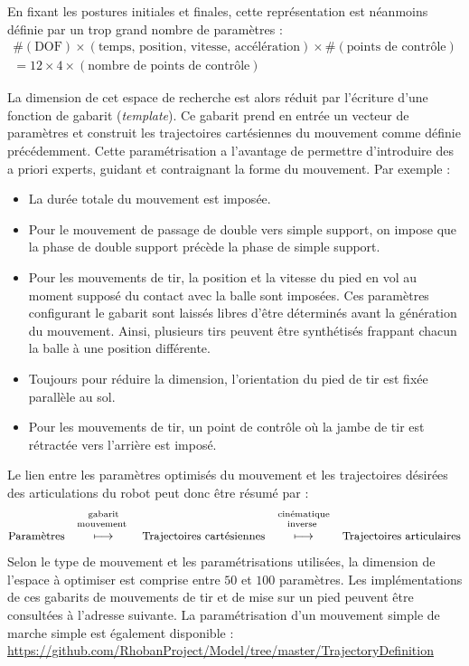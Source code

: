 En fixant les postures initiales et finales, cette représentation
est néanmoins définie par un trop grand nombre de paramètres : 
\begin{gather*}
\#(\text{DOF}) \times (\text{temps, position, vitesse, accélération}) 
\times \#(\text{points de contrôle}) \\
= 12 \times 4 \times(\text{nombre de points de contrôle})
\end{gather*}

La dimension de cet espace de recherche est alors réduit par
l'écriture d'une fonction de gabarit (\textit{template}).
Ce gabarit prend en entrée un vecteur de paramètres et construit 
les trajectoires cartésiennes du mouvement comme définie précédemment.
Cette paramétrisation a l'avantage de permettre d'introduire des
a priori experts, guidant et contraignant la forme du mouvement.
Par exemple :
\begin{itemize}
    \item La durée totale du mouvement est imposée.
    \item Pour le mouvement de passage de double vers simple support,
        on impose que la phase de double support précède la phase de simple support.
    \item Pour les mouvements de tir, la position et la vitesse du pied en vol
        au moment supposé du contact avec la balle sont imposées.
        Ces paramètres configurant le gabarit sont laissés libres 
        d'être déterminés avant la génération du mouvement.
        Ainsi, plusieurs tirs peuvent être synthétisés frappant chacun
        la balle à une position différente.
    \item Toujours pour réduire la dimension, l'orientation du pied de tir 
        est fixée parallèle au sol.
    \item Pour les mouvements de tir, un point de contrôle où la jambe de tir 
        est rétractée vers l'arrière est imposé.
\end{itemize}
Le lien entre les paramètres optimisés du mouvement et les trajectoires désirées des
articulations du robot peut donc être résumé par :
$$
\text{\small Paramètres} 
\overset{\parbox{2cm}{\centering \scriptsize gabarit mouvement \vspace{0.2cm}}}{\longmapsto}
\text{\small Trajectoires cartésiennes} 
\overset{\parbox{2cm}{\centering \scriptsize cinématique inverse \vspace{0.2cm}}}{\longmapsto}
\text{\small Trajectoires articulaires}
$$
Selon le type de mouvement et les paramétrisations utilisées, 
la dimension de l'espace à optimiser est comprise 
entre $50$ et $100$ paramètres.
Les implémentations de ces gabarits de mouvements de tir et de mise sur un pied
peuvent être consultées à l'adresse suivante. La paramétrisation d'un mouvement 
simple de marche simple est également disponible :\\
\url{https://github.com/RhobanProject/Model/tree/master/TrajectoryDefinition}\\

